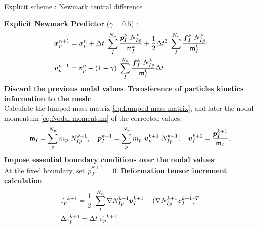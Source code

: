 \begin{algorithm}
\renewcommand{\thealgorithm}{}
\caption{Explicit scheme : Newmark central difference}
\label{alg:Second_step_MPM_2STG}
\begin{algorithmic}[1]
  \STATE \textbf{Explicit Newmark Predictor} ($\gamma = 0.5$) :
  \begin{align*}
    &\vec{x}_p^{n+1} = \vec{x}_p^n + \Delta t\ \sum^{N_n}_{I}\frac{\vec{p}_{I}^{k}\ N_{Ip}^k}{\tens{m}_I^k} + \frac{1}{2}\Delta t^2\ \sum^{N_n}_{I}\frac{\vec{f}_{I}^{k}\ N_{Ip}^k}{\tens{m}_I^k}\\
    &\vec{v}_p^{n+1} = \vec{v}_p^n + (1 - \gamma)\  \sum^{N_n}_{I}\frac{\vec{f}_{I}^{k}\ N_{Ip}^k}{\tens{m}_I^k}\Delta t        
  \end{align*}
  \STATE \textbf{Discard the previous nodal values}.
  \STATE \textbf{Transference of particles kinetics information to the
    mesh}:\\
  Calculate the lumped mass matrix \eqref{eq:Lumped-mass-matrix},
  and later the nodal momentum \eqref{eq:Nodal-momentum} of the
  corrected values.
  \begin{equation*}
    \tens{m}_{I} = \sum_{p}^{N_p} m_p\ N_{Ip}^{k+1},\quad
    \vec{p}_{I}^{k+1} = \sum_{p}^{N_p} m_p\ \vec{v}_{p}^{k+1}\ N_{Ip}^{k+1},\quad
    \vec{v}_{I}^{k+1} = \frac{\vec{p}_{I}^{k+1}}{\tens{m}_I}.
  \end{equation*}
  \STATE \textbf{Impose essential boundary conditions over the nodal
    values}:\\
  At the fixed boundary, set $\vec{p}_{I}^{k+1} = 0$.
  \STATE \textbf{Deformation tensor increment calculation}.
  \begin{align*}
    &\dot{\tens{\varepsilon}_{p}}^{k+1} = \frac{1}{2}\ \sum_{I}^{N_n}
    \Grad{N_{Ip}^{k+1}}\vec{v}_{I}^{k+1} +
      (\Grad{N_{Ip}^{k+1}}\vec{v}_{I}^{k+1})^T \\
    &\Delta \tens{\varepsilon}_{p}^{k+1} = \Delta t\ \dot{\tens{\varepsilon}_{p}}^{k+1}
  \end{align*}

\end{algorithmic}
\end{algorithm}
